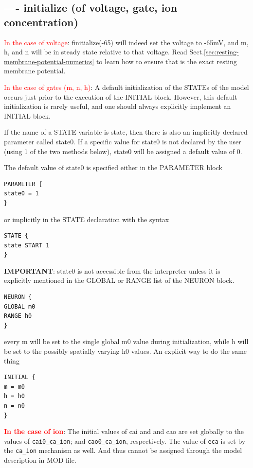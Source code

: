\subsection{---- initialize (of voltage, gate, ion concentration)}

\textcolor{red}{In the case of voltage}: finitialize(-65) will indeed set the
voltage to -65mV, and m, h, and n will be in steady state relative to that
voltage. Read Sect.\ref{sec:resting-membrane-potential-numerics} to learn how to
ensure that is the exact resting membrane potential.



\textcolor{red}{In the case of gates (m, n, h)}:
A default initialization of the STATEs of the model occurs just prior to the
execution of the INITIAL block. However, this default initialization is rarely
useful, and one should always explicitly implement an INITIAL block.

If the name of a STATE variable is state, then there is also
an implicitly declared parameter called state0.
If a specific value for state0 is not declared by the user (using 1 of the two
methods below), state0 will be assigned a default value of 0.


The default value of state0
is specified either in the PARAMETER block
\begin{verbatim}
PARAMETER {
state0 = 1
}
\end{verbatim}
or implicitly in the STATE declaration with the syntax
\begin{verbatim}
STATE {
state START 1
}
\end{verbatim}

{\bf IMPORTANT}: state0 is not accessible from the interpreter unless it is
explicitly mentioned in the GLOBAL or RANGE list of the NEURON block.
\begin{verbatim}
NEURON {
GLOBAL m0
RANGE h0
}
\end{verbatim}
every m will be set to the single global m0 value during initialization,
while h will be set to the possibly spatially varying h0 values. An explicit way
to do the same thing
\begin{verbatim}
INITIAL {
m = m0
h = h0
n = n0
}
\end{verbatim}

\textcolor{red}{\bf In the case of ion}:
The initial values of cai and and cao are set globally to the values of 
\verb!cai0_ca_ion!; and \verb!cao0_ca_ion!, respectively. 
The value of \verb!eca! is set by the \verb!ca_ion! mechanism as well. And thus
cannot be assigned through the model description in MOD file.

